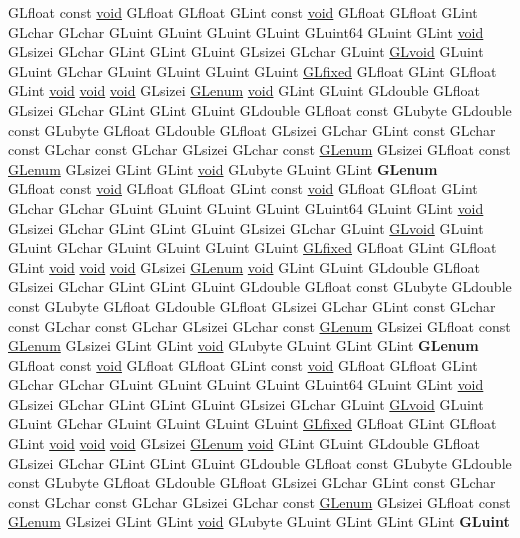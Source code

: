 \begin{DoxyCompactItemize}
\begin{tabbing}
\>GLfloat const \hyperlink{interfacevoid}{void} GLfloat GLfloat GLint const \hyperlink{interfacevoid}{void} GLfloat GLfloat GLint GLchar GLchar GLuint GLuint GLuint GLuint GLuint64 GLuint GLint \hyperlink{interfacevoid}{void} GLsizei GLchar GLint GLint GLuint GLsizei GLchar GLuint \hyperlink{interfacevoid}{GLvoid} GLuint GLuint GLchar GLuint GLuint GLuint GLuint \hyperlink{glheader_8h_ad6d3fa892df40dedf48ee6d84529ae5e}{GLfixed} GLfloat GLint GLfloat GLint \hyperlink{interfacevoid}{void} \hyperlink{interfacevoid}{void} \hyperlink{interfacevoid}{void} GLsizei \hyperlink{interfacevoid}{GLenum} \hyperlink{interfacevoid}{void} GLint GLuint GLdouble GLfloat GLsizei GLchar GLint GLint GLuint GLdouble GLfloat const GLubyte GLdouble const GLubyte GLfloat GLdouble GLfloat GLsizei GLchar GLint const GLchar const GLchar const GLchar GLsizei GLchar const \hyperlink{interfacevoid}{GLenum} GLsizei GLfloat const \hyperlink{interfacevoid}{GLenum} GLsizei GLint GLint \hyperlink{interfacevoid}{void} GLubyte GLuint GLint {\bfseries GLenum}\\
\>GLfloat const \hyperlink{interfacevoid}{void} GLfloat GLfloat GLint const \hyperlink{interfacevoid}{void} GLfloat GLfloat GLint GLchar GLchar GLuint GLuint GLuint GLuint GLuint64 GLuint GLint \hyperlink{interfacevoid}{void} GLsizei GLchar GLint GLint GLuint GLsizei GLchar GLuint \hyperlink{interfacevoid}{GLvoid} GLuint GLuint GLchar GLuint GLuint GLuint GLuint \hyperlink{glheader_8h_ad6d3fa892df40dedf48ee6d84529ae5e}{GLfixed} GLfloat GLint GLfloat GLint \hyperlink{interfacevoid}{void} \hyperlink{interfacevoid}{void} \hyperlink{interfacevoid}{void} GLsizei \hyperlink{interfacevoid}{GLenum} \hyperlink{interfacevoid}{void} GLint GLuint GLdouble GLfloat GLsizei GLchar GLint GLint GLuint GLdouble GLfloat const GLubyte GLdouble const GLubyte GLfloat GLdouble GLfloat GLsizei GLchar GLint const GLchar const GLchar const GLchar GLsizei GLchar const \hyperlink{interfacevoid}{GLenum} GLsizei GLfloat const \hyperlink{interfacevoid}{GLenum} GLsizei GLint GLint \hyperlink{interfacevoid}{void} GLubyte GLuint GLint GLint {\bfseries GLenum}\\
\>GLfloat const \hyperlink{interfacevoid}{void} GLfloat GLfloat GLint const \hyperlink{interfacevoid}{void} GLfloat GLfloat GLint GLchar GLchar GLuint GLuint GLuint GLuint GLuint64 GLuint GLint \hyperlink{interfacevoid}{void} GLsizei GLchar GLint GLint GLuint GLsizei GLchar GLuint \hyperlink{interfacevoid}{GLvoid} GLuint GLuint GLchar GLuint GLuint GLuint GLuint \hyperlink{glheader_8h_ad6d3fa892df40dedf48ee6d84529ae5e}{GLfixed} GLfloat GLint GLfloat GLint \hyperlink{interfacevoid}{void} \hyperlink{interfacevoid}{void} \hyperlink{interfacevoid}{void} GLsizei \hyperlink{interfacevoid}{GLenum} \hyperlink{interfacevoid}{void} GLint GLuint GLdouble GLfloat GLsizei GLchar GLint GLint GLuint GLdouble GLfloat const GLubyte GLdouble const GLubyte GLfloat GLdouble GLfloat GLsizei GLchar GLint const GLchar const GLchar const GLchar GLsizei GLchar const \hyperlink{interfacevoid}{GLenum} GLsizei GLfloat const \hyperlink{interfacevoid}{GLenum} GLsizei GLint GLint \hyperlink{interfacevoid}{void} GLubyte GLuint GLint GLint GLint {\bfseries GLuint}\\

\end{tabbing}
\end{DoxyCompactItemize}
